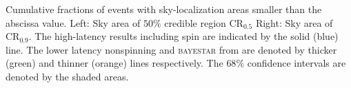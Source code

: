 \label{fig:sky} Cumulative fractions of events with sky-localization areas smaller than the abscissa value. Left: Sky area of $50\%$ credible region $\mathrm{CR}_{0.5}$ Right: Sky area of $\mathrm{CR}_{0.9}$. The high-latency results including spin are indicated by the solid (blue) line. The lower latency nonspinning and \textsc{bayestar} from \citet{Singer_2014} are denoted by thicker (green) and thinner (orange) lines respectively. The $68\%$ confidence intervals are denoted by the shaded areas.